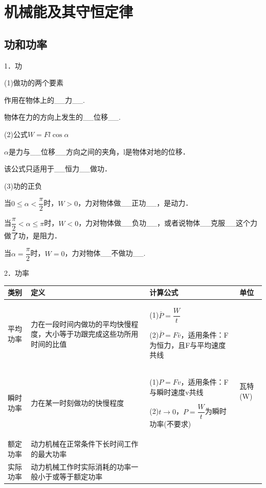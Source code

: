 \chapter{机械能及其守恒定律}

\section{功和功率}


1．功

(1)做功的两个要素

作用在物体上的\_\_力\_\_.

物体在力的方向上发生的\_\_位移\_\_.

(2)公式$W=Fl\cos \alpha$

$\alpha$是力与\_\_位移\_\_方向之间的夹角，l是物体对地的位移．

该公式只适用于\_\_恒力\_\_做功．

(3)功的正负

当$0\leq \alpha<\dfrac{\pi}{2}$时，$W>0$，力对物体做\_\_正功\_\_，是动力．

当$\dfrac{\pi}{2}<\alpha\leq π$时，$W<0$，力对物体做\_\_负功\_\_，或者说物体\_\_克服\_\_这个力做了功，是阻力．

当$\alpha=\dfrac{\pi}{2}$时，$W=0$，力对物体\_\_不做功\_\_.

2．功率

\begin{longtable}[]{@{}m{1.6cm}m{5cm}m{6cm}m{1cm}@{}}
\toprule
类别 & 定义 & 计算公式 & 单位\tabularnewline
\midrule
\endhead

平均功率&
力在一段时间内做功的平均快慢程度，大小等于功跟完成这些功所用时间的比值
& 
(1)$\bar{P}=\dfrac{W}{t}$

(2)$\bar{P}=F \bar{v}$，适用条件：F为恒力，且F与平均速度共线
&\multirow{4}{1cm}{瓦特(W)}
\tabularnewline
瞬时功率&
力在某一时刻做功的快慢程度
& \begin{minipage}[t]{0.4\columnwidth}\raggedright
(1)$P=Fv$，适用条件：F与瞬时速度v共线

(2)$t\rightarrow 0$，$P=\dfrac{W}{t}$为瞬时功率(不要求)\strut
\end{minipage} & \begin{minipage}[t]{0.22\columnwidth}\raggedright
\strut
\end{minipage}\tabularnewline

额定功率 & 
\begin{minipage}[t]{0.8\columnwidth}\raggedright
动力机械在正常条件下长时间工作的最大功率
\end{minipage} &
&\tabularnewline
实际功率 & 
\begin{minipage}[t]{0.8\columnwidth}\raggedright
动力机械工作时实际消耗的功率一般小于或等于额定功率
\end{minipage}
 &
&\tabularnewline
\bottomrule
\end{longtable}

